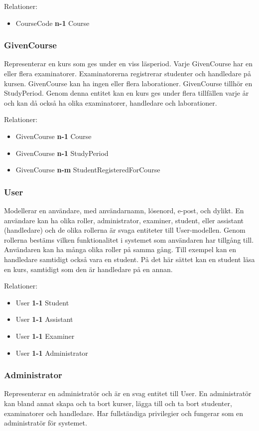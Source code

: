 Relationer:
\begin{itemize}
  \item CourseCode {\bf n-1} Course
\end{itemize}


\subsubsection{GivenCourse}
Representerar en kurs som ges under en viss läsperiod. Varje GivenCourse har en eller flera examinatorer. Examinatorerna registrerar studenter och handledare på kursen. GivenCourse kan ha ingen eller flera laborationer. GivenCourse tillhör en StudyPeriod. Genom denna entitet kan en kurs ges under flera tillfällen varje år och kan då också ha olika examinatorer, handledare och laborationer.

Relationer:
\begin{itemize}
  \item GivenCourse {\bf n-1} Course
  \item GivenCourse {\bf n-1} StudyPeriod
  \item GivenCourse {\bf n-m} StudentRegisteredForCourse 
\end{itemize}


\subsubsection{User}
Modellerar en användare, med användarnamn, lösenord, e-post, och dylikt. En användare kan ha olika roller, administrator, examiner, student, eller assistant (handledare) och de olika rollerna är svaga entiteter till User-modellen. Genom rollerna bestäms vilken funktionalitet i systemet som användaren har tillgång till. Användaren kan ha många olika roller på samma gång. Till exempel kan en handledare samtidigt också vara en student. På det här sättet kan en student läsa en kurs, samtidigt som den är handledare på en annan. 

Relationer:
\begin{itemize}
  \item User {\bf 1-1} Student
  \item User {\bf 1-1} Assistant
  \item User {\bf 1-1} Examiner
  \item User {\bf 1-1} Administrator
\end{itemize}


\subsubsection{Administrator}
Representerar en administratör och är en svag entitet till User. En administratör kan bland annat skapa och ta bort kurser, lägga till och ta bort studenter, examinatorer och handledare. Har fullständiga privilegier och fungerar som en administratör för systemet.

